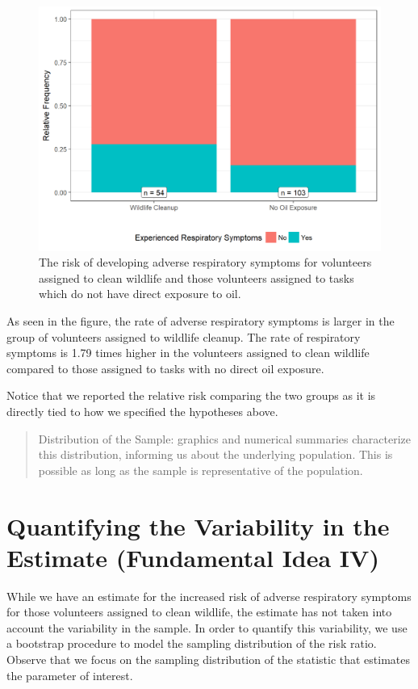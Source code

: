 \documentclass[]{book}
\theoremstyle{definition}
\theoremstyle{definition}
\theoremstyle{definition}
\theoremstyle{remark}
\begin{document}
\begin{figure}

{\centering \includegraphics[width=0.8\linewidth]{./Images/recaplanguage-deepwater-plot-1} 

}

\caption{The risk of developing adverse respiratory symptoms for volunteers assigned to clean wildlife and those volunteers assigned to tasks which do not have direct exposure to oil.}\label{fig:recaplanguage-deepwater-plot}
\end{figure}

As seen in the figure, the rate of adverse respiratory symptoms is
larger in the group of volunteers assigned to wildlife cleanup. The rate
of respiratory symptoms is 1.79 times higher in the volunteers assigned
to clean wildlife compared to those assigned to tasks with no direct oil
exposure.

Notice that we reported the relative risk comparing the two groups as it
is directly tied to how we specified the hypotheses above.

\begin{quote}
Distribution of the Sample: graphics and numerical summaries
characterize this distribution, informing us about the underlying
population. This is possible as long as the sample is representative of
the population.
\end{quote}

\section{Quantifying the Variability in the Estimate (Fundamental Idea
IV)}\label{quantifying-the-variability-in-the-estimate-fundamental-idea-iv}

While we have an estimate for the increased risk of adverse respiratory
symptoms for those volunteers assigned to clean wildlife, the estimate
has not taken into account the variability in the sample. In order to
quantify this variability, we use a bootstrap procedure to model the
sampling distribution of the risk ratio. Observe that we focus on the
sampling distribution of the statistic that estimates the parameter of
interest.
\end{document}
